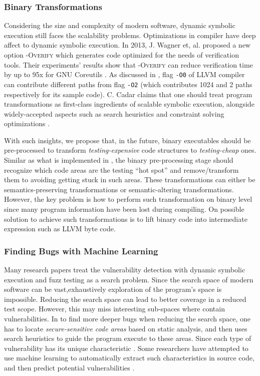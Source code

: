 \subsubsection{Binary Transformations}
Considering the size and complexity of modern software, dynamic symbolic execution still faces the scalability problems. 
 Optimizations in compiler have deep affect to dynamic symbolic execution. 
 In 2013, J. Wagner et, al. proposed a new option \textsc{-Overify} which generates code optimized for the needs of verification tools.
  Their experiments' results show that \textsc{-Overify} can reduce verification time by up to 95x for GNU Coreutils \cite{wagner2013overify}.
 As discussed in \cite{Cadar:2015:TPT}, flag \texttt{-O0} of LLVM compiler can contribute different paths from flag \texttt{-O2} (which contributes 1024 and 2 paths respectively for its sample code).
 C. Cadar claims that one should treat program transformations as first-class ingredients of scalable symbolic execution, alongside widely-accepted aspects such as search heuristics and constraint solving optimizations \cite{Cadar:2015:TPT}. 
 
With such insights, we propose that, in the future, binary executables should be pre-processed to transform \textit{testing-expensive} code structures to \textit{testing-cheap} ones.
  Similar as what is implemented in \cite{wagner2015high}, the binary pre-processing stage should recognize which code areas are the testing ``hot spot'' and remove/transform them to avoiding getting stuck in such areas.
  These transformations can either be semantics-preserving transformations or semantic-altering transformations. 
 However, the key problem is how to perform such transformation on binary level since many program information have been lost during compiling. 
 On possible solution to achieve such transformations is to lift binary code into intermediate expression such as LLVM byte code. 

\subsubsection{Finding Bugs with Machine Learning}
Many research papers treat the vulnerability detection with dynamic symbolic execution and fuzz testing as a search problem.
 Since the search space of modern software can be vast,exhaustively exploration of the program's space is impossible.
 Reducing the search space can lead to better coverage in a reduced test scope.
 However, this may miss interesting sub-spaces where contain vulnerabilities. 
 In to find more deeper bugs when reducing the search space, one has to locate \textit{secure-sensitive code areas} based on static analysis, and then uses search heuristics to guide the program execute to these areas.
 Since each type of vulnerability has its unique characteristic \cite{MBishop:ATBOC, wang2009intscope, wang2010ricb}. 
 Some researchers have attempted to use machine learning to automatically extract such characteristics in source code, and then predict potential vulnerabilities \cite{VCCFinder, Yamaguchi:2011:VEA}.

